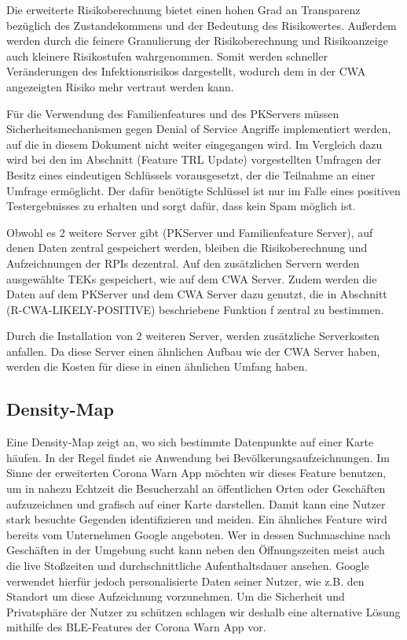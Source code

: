 \documentclass[conference]{IEEEtran}
\begin{document}
Die erweiterte Risikoberechnung bietet einen hohen Grad an Transparenz bezüglich des Zustandekommens und der Bedeutung des Risikowertes. 
Außerdem werden durch die feinere Granulierung der Risikoberechnung und Risikoanzeige auch kleinere Risikostufen wahrgenommen. 
Somit werden schneller Veränderungen des Infektionsrisikos dargestellt, wodurch dem in der CWA angezeigten Risiko mehr vertraut werden kann.

Für die Verwendung des Familienfeatures und des PKServers müssen Sicherheitsmechanismen gegen Denial of Service Angriffe implementiert werden, 
auf die in diesem Dokument nicht weiter eingegangen wird.
Im Vergleich dazu wird bei den im Abschnitt (Feature TRL Update) vorgestellten Umfragen der Besitz eines eindeutigen Schlüssels vorausgesetzt,
der die Teilnahme an einer Umfrage ermöglicht. Der dafür benötigte Schlüssel ist nur im Falle eines positiven Testergebnisses zu erhalten und sorgt dafür, dass kein Spam möglich ist.

Obwohl es 2 weitere Server gibt (PKServer und Familienfeature Server), auf denen Daten zentral gespeichert werden, bleiben die Risikoberechnung und Aufzeichnungen der RPIs dezentral. 
Auf den zusätzlichen Servern werden ausgewählte TEKs gespeichert, wie auf dem CWA Server. 
Zudem werden die Daten auf dem PKServer und dem CWA Server dazu genutzt, die in Abschnitt (R-CWA-LIKELY-POSITIVE) beschriebene Funktion f zentral zu bestimmen.

Durch die Installation von 2 weiteren Server, werden zusätzliche Serverkosten anfallen. Da diese Server einen ähnlichen Aufbau wie der CWA Server haben, 
werden die Kosten für diese in einen ähnlichen Umfang haben. 
\\
\subsection{Density-Map}
Eine Density-Map zeigt an, wo sich bestimmte Datenpunkte auf einer Karte häufen. 
In der Regel findet sie Anwendung bei Bevölkerungsaufzeichnungen. 
Im Sinne der erweiterten Corona Warn App möchten wir dieses Feature benutzen, um in nahezu Echtzeit die Besucherzahl an öffentlichen Orten oder Geschäften aufzuzeichnen und grafisch auf einer Karte darstellen. 
Damit kann eine Nutzer stark besuchte Gegenden identifizieren und meiden. 
Ein ähnliches Feature wird bereits vom Unternehmen Google angeboten. 
Wer in dessen Suchmaschine nach Geschäften in der Umgebung sucht kann neben den Öffnungszeiten meist auch die live Stoßzeiten und durchschnittliche Aufenthaltsdauer ansehen. 
Google verwendet hierfür jedoch personalisierte Daten seiner Nutzer, wie z.B. den Standort um diese Aufzeichnung vorzunehmen. 
Um die Sicherheit und Privatsphäre der Nutzer zu schützen schlagen wir deshalb eine alternative Lösung mithilfe des BLE-Features der Corona Warn App vor. \\
\end{document}
